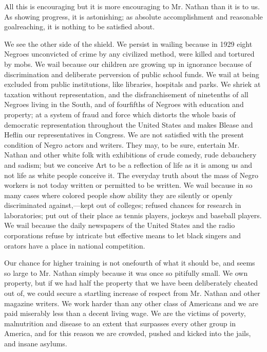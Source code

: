 \documentclass[letterpaper,10pt,english]{jupyterBook}
\begin{document}
\sphinxAtStartPar
All this is encouraging but it is more encouraging to Mr. Nathan than it is to us. As showing progress, it is astonishing; as absolute accomplishment and reasonable goal\sphinxhyphen{}reaching, it is nothing to be satisfied about.

\sphinxAtStartPar
We see the other side of the shield. We persist in wailing because in 1929 eight Negroes unconvicted of crime by any civilized method, were killed and tortured by mobs. We wail because our children are growing up in ignorance because of discrimination and deliberate perversion of public school funds. We wail at being excluded from public institutions, like libraries, hospitals and parks. We shriek at taxation without representation, and the disfranchisement of nine\sphinxhyphen{}tenths of all Negroes living in the South, and of four\sphinxhyphen{}fifths of Negroes with education and property; at a system of fraud and force which distorts the whole basis of democratic representation throughout the United States and makes Blease and Heflin our representatives in Congress. We are not satisfied with the present condition of Negro actors and writers. They may, to be sure, entertain Mr. Nathan and other white folk with exhibitions of crude comedy, rude debauchery and sadism; but we conceive Art to be a reflection of life as it is among us and not life as white people conceive it. The every\sphinxhyphen{}day truth about the mass of Negro workers is not today written or permitted to be written. We wail because in so many cases where colored people show ability they are silently or openly discriminated against,—kept out of colleges; refused chances for research in laboratories; put out of their place as tennis players, jockeys and baseball players. We wail because the daily newspapers of the United States and the radio corporations refuse by intricate but effective means to let black singers and orators have a place in national competition.

\sphinxAtStartPar
Our chance for higher training is not one\sphinxhyphen{}fourth of what it should be, and seems so large to Mr. Nathan simply because it was once so pitifully small. We own property, but if we had half the property that we have been deliberately cheated out of, we could secure a startling increase of respect from Mr. Nathan and other magazine writers. We work harder than any other class of Americans and we are paid miserably less than a decent living wage. We are the victims of poverty, malnutrition and disease to an extent that surpasses every other group in America, and for this reason we are crowded, pushed and kicked into the jails, and insane asylums.
\end{document}
